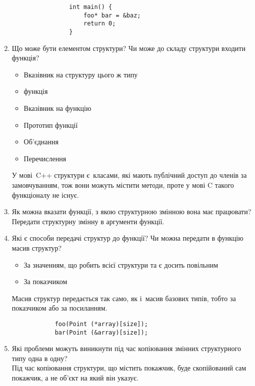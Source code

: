 \begin{enumerate}
\begin{verbatim}
                int main() {
                    foo* bar = &baz;
                    return 0;
                }
          \end{verbatim}
    \item Що може бути елементом структури? Чи може до складу структури входити функція?
          \begin{itemize}
              \item Вказівник на структуру цього ж типу
              \item функція
              \item Вказівник на функцію
              \item Прототип функції
              \item Об'єднання
              \item Перечислення
          \end{itemize}
          У мові C++ структури є класами, які мають публічний доступ
          до членів за замовчуванням, тож вони можуть містити методи,
          проте у мові C такого функціоналу не існує.
    \item Як можна вказати функції, з якою структурною змінною вона має працювати? \\
          Передати структурну змінну в аргументи функції.
    \item Які є способи передачі структур до функції? Чи можна передати в функцію масив структур?
          \begin{itemize}
              \item За значенням, що робить всієї структури та є досить повільним
              \item За показчиком
          \end{itemize}
          Масив структур передається так само, як і масив базових типів,
          тобто за показчиком або за посиланням.
          \begin{verbatim}
            foo(Point (*array)[size]);
            bar(Point (&array)[size]);
          \end{verbatim}
    \item Які проблеми можуть виникнути під час копіювання змінних структурного типу одна в одну? \\
          Під час копіювання структури, що містить покажчик,
          буде скопійований сам покажчик, а не об’єкт на який він указує.
\end{enumerate}
